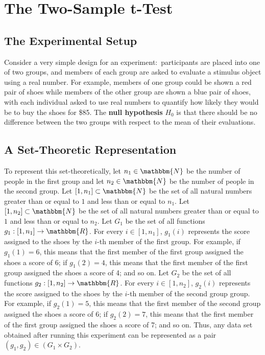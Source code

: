 \documentclass[11pt]{article}
\theoremstyle{definition}
\theoremstyle{remark}
\begin{document}
\section{The Two-Sample t-Test}
\subsection{The Experimental Setup}
Consider a very simple design for an experiment:\ participants are placed into one of two groups, and members of each group are asked to evaluate a stimulus object using a real number. For example, members of one group could be shown a red pair of shoes while members of the other group are shown a blue pair of shoes, with each individual asked to use real numbers to quantify how likely they would be to buy the shoes for \$85. The \textbf{null hypothesis} $H_{0}$ is that there should be no difference between the two groups with respect to the mean of their evaluations.\par

\subsection{A Set-Theoretic Representation}
To represent this set-theoretically, let $n_{1}\in\mathbbm{N}$ be the number of people in the first group and let $n_{2}\in\mathbbm{N}$ be the number of people in the second group. Let $[1,n_{1}]\subset\mathbbm{N}$ be the set of all natural numbers greater than or equal to $1$ and less than or equal to $n_{1}$. Let $[1,n_{2}]\subset\mathbbm{N}$ be the set of all natural numbers greater than or equal to $1$ and less than or equal to $n_{2}$. Let $G_{1}$ be the set of all functions $g_{1}:[1,n_{1}]\rightarrow\mathbbm{R}$. For every $i\in[1,n_{1}]$, $g_{1}(i)$ represents the score assigned to the shoes by the $i$-th member of the first group. For example, if $g_{1}(1)=6$, this means that the first member of the first group assigned the shoes a score of 6; if $g_{1}(2)=4$, this means that the first member of the first group assigned the shoes a score of 4; and so on. Let $G_{2}$ be the set of all functions $g_{2}:[1,n_{2}]\rightarrow\mathbbm{R}$.  For every $i\in[1,n_{2}]$, $g_{2}(i)$ represents the score assigned to the shoes by the $i$-th member of the second group group. For example, if $g_{2}(1)=5$, this means that the first member of the second group assigned the shoes a score of 6; if $g_{2}(2)=7$, this means that the first member of the first group assigned the shoes a score of 7; and so on. Thus, any data set obtained after running this experiment can be represented as a pair $(g_{1},g_{2})\in (G_{1}\times G_{2})$.\par
\end{document}
